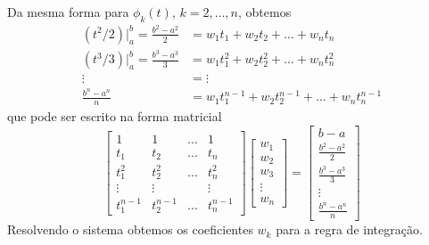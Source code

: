 Da mesma forma para $\phi_k(t)$, $k=2,\ldots,n$, obtemos
\begin{align}
   (t^2/2)|_a^b = \frac{b^2-a^2}{2} &=  w_1t_1  +w_2t_2  +\ldots +w_nt_n   \\
   (t^3/3)|_a^b = \frac{b^3-a^3}{3} &=  w_1t_1^2+w_2t_2^2+\ldots +w_nt_n^2 \\
                    \vdots          &=  \vdots    \\
 \frac{b^{n}-a^{n}}{n}              &=  w_1t_1^{n-1}+w_2t_2^{n-1}+\ldots +w_nt_n^{n-1}
\end{align}
que pode ser escrito na forma matricial
\begin{equation}
\begin{bmatrix}
    1     &  1    & \ldots   &  1 \\
    t_1   &  t_2   & \ldots   & t_n \\
    t_1^2 &  t_2^2  & \ldots   & t_n^2 \\
    \vdots    &  \vdots     &    & \vdots   \\
    t_1^{n-1} & t_2^{n-1} & \ldots   & t_n^{n-1}
\end{bmatrix}
\begin{bmatrix}  w_1 \\ w_2\\ w_3  \\ \vdots   \\ w_n     \end{bmatrix}
=
\begin{bmatrix}  b-a  \\ \frac{b^2-a^2}{2} \\ \frac{b^3-a^3}{3} \\ \vdots  \\ \frac{b^{n}-a^{n}}{n}  \end{bmatrix}
\end{equation}
Resolvendo o sistema obtemos os coeficientes $w_k$ para a regra de integração.

